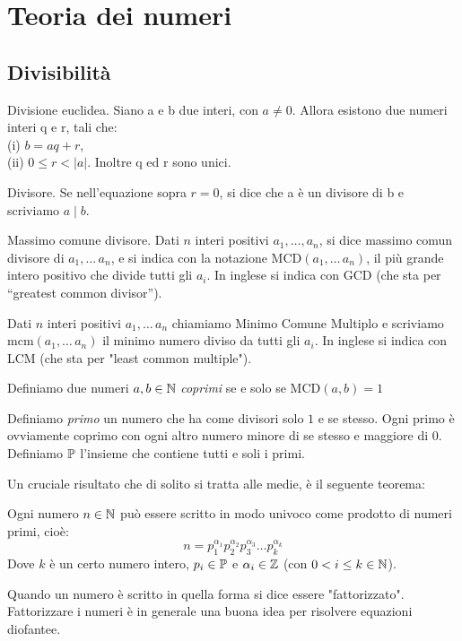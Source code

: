 \documentclass[11pt]{scrartcl}
\begin{document}
	\section{Teoria dei numeri}
	\subsection{Divisibilità}
	\begin{definition}
		Divisione euclidea. Siano a e b due interi, con $a \neq 0$. Allora esistono due numeri interi q e r, tali che:\\
		(i) $b = aq + r$, \\
		(ii) $ 0 \le r < |a|$.
		Inoltre q ed r sono unici.
		\\
	\end{definition}
	\begin{definition}
		Divisore. Se nell'equazione sopra $r = 0$, si dice che a è un divisore di b e scriviamo $a \mid b$.
	\end{definition}
	\begin{definition}
		Massimo comune divisore. Dati $n$ interi positivi $a_1,\dots, a_n$, si dice massimo
		comun divisore di $a_1,\dots\, a_n$, e si indica con la notazione
		$\text{MCD}(a_1,\dots\, a_n)$, il più grande intero positivo che divide tutti gli $a_i$. In inglese si indica con GCD (che sta per “greatest common divisor”).
	\end{definition} 
	\begin{definition}
		Dati $n$ interi positivi $a_1,\dots\,a_n$ chiamiamo Minimo Comune Multiplo e scriviamo $\text{mcm}(a_1,\dots\,a_n)$ il minimo numero diviso da tutti gli $a_i$. In inglese si indica con LCM (che sta per "least common multiple").
	\end{definition}
	\begin{definition}
		Definiamo due numeri $a,b \in \mathbb N$ \textit{coprimi} se e solo se $\text{MCD}(a,b)=1$
	\end{definition}
	\begin{definition}
		Definiamo \textit{primo} un numero che ha come divisori solo $1$ e se stesso. Ogni primo è ovviamente coprimo con ogni altro numero minore di se stesso e maggiore di $0$. Definiamo $\mathbb P$ l'insieme che contiene tutti e soli i primi.
	\end{definition}
	
	Un cruciale risultato che di solito si tratta alle medie, è il seguente teorema:
	\begin{theorem}
		Ogni numero $n\in\mathbb N$ può essere scritto in modo univoco come prodotto di numeri primi, cioè:
		$$n=p_1^{\alpha_1}p_2^{\alpha_2}p_3^{\alpha_3}\dots p_k^{\alpha_k}$$
		Dove $k$ è un certo numero intero, $p_i\in \mathbb P$ e $\alpha_i\in \mathbb Z$ (con $0<i\le k \in \mathbb N$). 
	\end{theorem}
	Quando un numero è scritto in quella forma si dice essere "fattorizzato". Fattorizzare i numeri è in generale una buona idea per risolvere equazioni diofantee.
	
\end{document}

